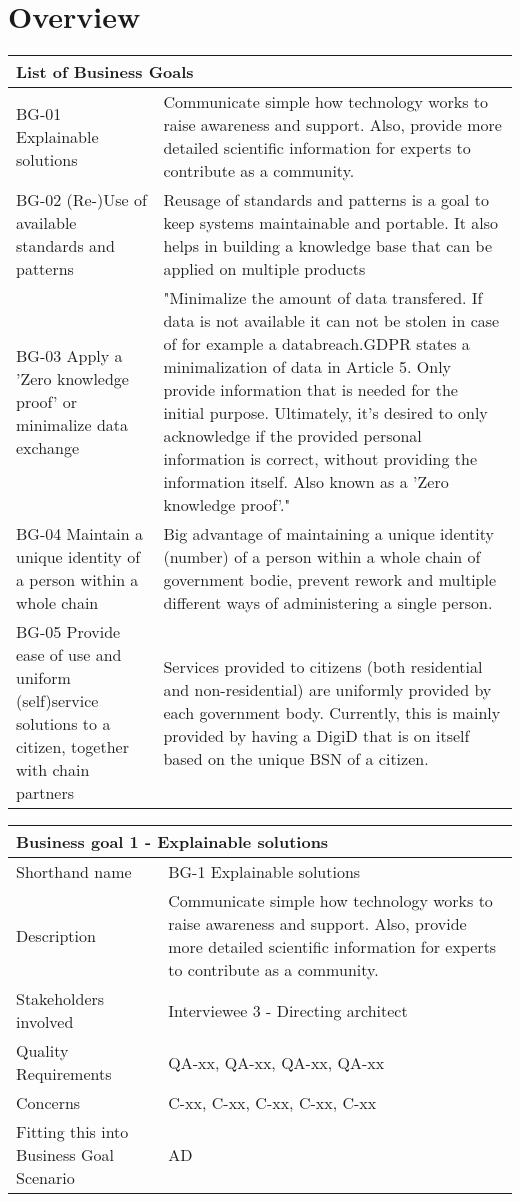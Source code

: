 \chapter{Overview}\label{s:overview}

\begin{tabular}{ |p{5cm}||p{11cm}|}
 \hline
 \multicolumn{2}{|l|}{List of Business Goals} \\
 \hline
 BG-01 Explainable solutions   &   Communicate simple how technology works to raise awareness and support. Also, provide more detailed scientific information for experts to contribute as a community.     \\
 \hline
 BG-02 (Re-)Use of available standards and patterns &  Reusage of standards and patterns is a goal to keep systems maintainable and portable. It also helps in building a knowledge base that can be applied on multiple products \\
  \hline
 BG-03 Apply a 'Zero knowledge proof' or minimalize data exchange & "Minimalize the amount of data transfered. If data is not available it can not be stolen in case of for example a databreach.GDPR states a minimalization of data in Article 5. Only provide information that is needed for the initial purpose.
Ultimately, it's desired to only acknowledge if the provided personal information is correct, without providing the information itself. Also known as a 'Zero knowledge proof'."  \\
  \hline
BG-04 Maintain a unique identity of a person within a whole chain & Big advantage of maintaining a unique identity (number) of a person within a whole chain of government bodie, prevent rework and multiple different ways of administering a single person.  \\
  \hline
 BG-05 Provide ease of use and uniform (self)service solutions to a citizen, together with chain partners &  Services provided to citizens (both residential and non-residential) are uniformly provided by each government body. Currently, this is mainly provided by having a DigiD that is on itself based on the unique BSN of a citizen.\\
\end{tabular}

\begin{tabular}{ |p{3cm}||p{10cm}|}
 \hline
 \multicolumn{2}{|l|}{Business goal 1 - Explainable solutions} \\
 \hline
 Shorthand name   & BG-1 Explainable solutions    \\
 \hline
 Description &   Communicate simple how technology works to raise awareness and support. Also, provide more detailed scientific information for experts to contribute as a community.  \\
  \hline
 Stakeholders involved & Interviewee 3 - Directing architect  \\
  \hline
 Quality Requirements   & QA-xx, QA-xx, QA-xx, QA-xx \\
  \hline
 Concerns &   C-xx, C-xx, C-xx, C-xx, C-xx\\
  \hline
 Fitting this into Business Goal Scenario & AD \\
 \hline
\end{tabular}


